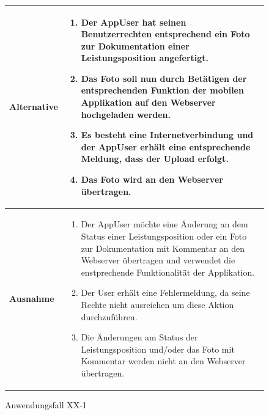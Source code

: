 			\begin{figure}[h]
	\centering
	\begin{tabularx}{\textwidth}{ X | X }
		\textbf{Alternative} & 
				\begin{enumerate}
					 \item Der AppUser hat seinen Benutzerrechten entsprechend ein Foto zur Dokumentation einer Leistungsposition angefertigt.
					 \item Das Foto soll nun durch Bet\"atigen der entsprechenden Funktion der mobilen Applikation auf den Webserver hochgeladen werden.
					 \item Es besteht eine Internetverbindung und der AppUser erh\"alt eine entsprechende Meldung,  dass der Upload erfolgt.
					 \item Das Foto wird an den Webserver \"ubertragen.
				\end{enumerate}  \\ \hline
						\textbf{Ausnahme} &
				\begin{enumerate}
					 \item Der AppUser m\"ochte eine \"Anderung an dem Status einer Leistungsposition oder ein Foto zur Dokumentation mit Kommentar an den Webserver \"ubertragen und verwendet die enstprechende Funktionalit\"at der Applikation.
					 \item Der User erh\"alt eine Fehlermeldung, da seine Rechte nicht ausreichen um diese Aktion durchzuf\"uhren.
					 \item Die \"Anderungen am Status der Leistungsposition und/oder das Foto mit Kommentar werden nicht an den Webserver \"ubertragen.
					 \end{enumerate} \\ \hline
	\end{tabularx}
	\caption{Anwendungsfall XX-1}
	\label{fig:anwendungsfall-app-tabelle-xx-2}
\end{figure}
